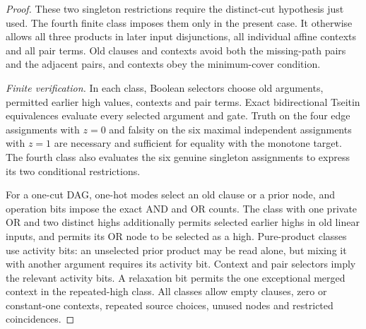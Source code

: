 \begin{proof}
These two singleton restrictions require the distinct-cut hypothesis
just used. The fourth finite class imposes them only in the present
case. It otherwise allows all three products in later input
disjunctions, all individual affine contexts and all pair terms.
Old clauses and contexts avoid both the missing-path pairs and the
adjacent pairs, and contexts obey the minimum-cover condition.

\emph{Finite verification.}
In each class, Boolean selectors choose old arguments, permitted
earlier high values, contexts and pair terms. Exact bidirectional
Tseitin equivalences evaluate every selected argument and gate.
Truth on the four edge assignments with $z=0$ and falsity on the six
maximal independent assignments with $z=1$ are necessary and
sufficient for equality with the monotone target. The fourth class
also evaluates the six genuine singleton assignments to express its
two conditional restrictions.

For a one-cut DAG, one-hot modes select an old clause or a prior
node, and operation bits impose the exact AND and OR counts.
The class with one private OR and two distinct highs additionally
permits selected earlier highs in old linear inputs, and permits its
OR node to be selected as a high. Pure-product classes use activity
bits: an unselected prior product may be read alone, but mixing it
with another argument requires its activity bit. Context and pair
selectors imply the relevant activity bits. A relaxation bit permits
the one exceptional merged context in the repeated-high class.
All classes allow empty clauses, zero or constant-one contexts,
repeated source choices, unused nodes and restricted coincidences.


\end{proof}
